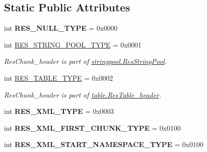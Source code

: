 \subsection*{Static Public Attributes}
\begin{DoxyCompactItemize}
\item 
\mbox{\label{classtypes_1_1ResourceType_a42d6fe485be35898f92bf0c0ae6b3833}} 
int {\bfseries R\+E\+S\+\_\+\+N\+U\+L\+L\+\_\+\+T\+Y\+PE} = 0x0000
\item 
\mbox{\label{classtypes_1_1ResourceType_a3cab1b74652ffa87927c28e14e9c483a}} 
int \mbox{\hyperlink{classtypes_1_1ResourceType_a3cab1b74652ffa87927c28e14e9c483a}{R\+E\+S\+\_\+\+S\+T\+R\+I\+N\+G\+\_\+\+P\+O\+O\+L\+\_\+\+T\+Y\+PE}} = 0x0001
\begin{DoxyCompactList}\small\item\em Res\+Chunk\+\_\+header is part of \mbox{\hyperlink{classstringpool_1_1ResStringPool}{stringpool.\+Res\+String\+Pool}}. \end{DoxyCompactList}\item 
\mbox{\label{classtypes_1_1ResourceType_a872990eef083d5acf90715bc2fcacb2a}} 
int \mbox{\hyperlink{classtypes_1_1ResourceType_a872990eef083d5acf90715bc2fcacb2a}{R\+E\+S\+\_\+\+T\+A\+B\+L\+E\+\_\+\+T\+Y\+PE}} = 0x0002
\begin{DoxyCompactList}\small\item\em Res\+Chunk\+\_\+header is part of \mbox{\hyperlink{classtable_1_1ResTable__header}{table.\+Res\+Table\+\_\+header}}. \end{DoxyCompactList}\item 
\mbox{\label{classtypes_1_1ResourceType_a4e8cca884eeaf6a997a87e0edb0ba725}} 
int {\bfseries R\+E\+S\+\_\+\+X\+M\+L\+\_\+\+T\+Y\+PE} = 0x0003
\item 
\mbox{\label{classtypes_1_1ResourceType_ad747b80dabe6b5d3f69aa3cc53e158c4}} 
int {\bfseries R\+E\+S\+\_\+\+X\+M\+L\+\_\+\+F\+I\+R\+S\+T\+\_\+\+C\+H\+U\+N\+K\+\_\+\+T\+Y\+PE} = 0x0100
\item 
\mbox{\label{classtypes_1_1ResourceType_a35d4c2119326e1d00c4f83655df4e5d3}} 
int {\bfseries R\+E\+S\+\_\+\+X\+M\+L\+\_\+\+S\+T\+A\+R\+T\+\_\+\+N\+A\+M\+E\+S\+P\+A\+C\+E\+\_\+\+T\+Y\+PE} = 0x0100

\end{DoxyCompactItemize}
